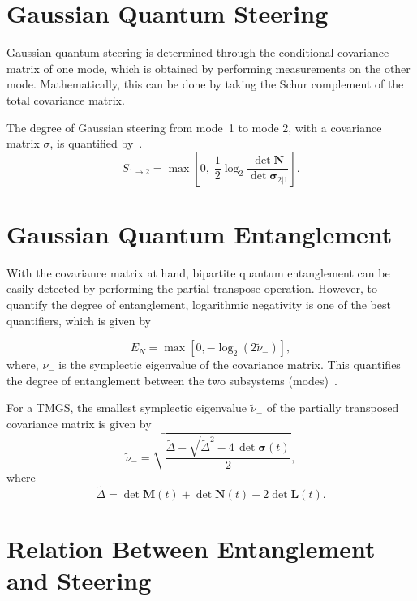 \section{Gaussian Quantum Steering}

Gaussian quantum steering is determined through the conditional covariance matrix of one mode, which is obtained by performing measurements on the other mode. Mathematically, this can be done by taking the Schur complement of the total covariance matrix.

The degree of Gaussian steering from mode~1 to mode 2, with a covariance matrix $\sigma$, is quantified by~\cite{Kogias2015,Simon2000,Adesso2007,Rai2010}.
\begin{equation}
	S_{1\to2}
	=
	\max\!\left[
	0,\;
	\frac12\log_2
	\frac{\det \mathbf{N}}{\det \boldsymbol{\sigma}_{2|1}}
	\right].
\end{equation}

\section{Gaussian Quantum Entanglement}
With the covariance matrix at hand, bipartite quantum entanglement can be easily detected by performing the partial transpose operation. However, to quantify the degree of entanglement, logarithmic negativity is one of the best quantifiers, which is given by


\begin{equation}
	E_N=\max\!\left[0,-\log_2(2\tilde{\nu}_-)\right],
\end{equation}
where, $\nu_{-}$ is the symplectic eigenvalue of the covariance matrix.
This quantifies the degree of entanglement between the two subsystems (modes)~\cite{Rai2010}.


For a TMGS, the smallest symplectic eigenvalue
$\tilde{\nu}_{-}$ of the partially transposed covariance matrix is given by~\cite{AdessoSerafiniIlluminati2004,Serafini2017,Rai2010}
\[
\tilde{\nu}_{-}
=
\sqrt{
	\frac{\tilde{\Delta}
		-\sqrt{\tilde{\Delta}^{2}-4\,\det\boldsymbol{\sigma}(t)}}{2}
},
\]
where
\[
\tilde{\Delta}
=
\det\mathbf{M}(t)
+
\det\mathbf{N}(t)
-
2\det\mathbf{L}(t).
\]





\section{Relation Between Entanglement and Steering}

